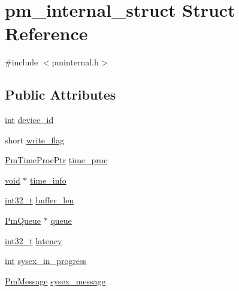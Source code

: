 \hypertarget{structpm__internal__struct}{}\section{pm\+\_\+internal\+\_\+struct Struct Reference}
\label{structpm__internal__struct}


{\ttfamily \#include $<$pminternal.\+h$>$}

\subsection*{Public Attributes}
\begin{DoxyCompactItemize}
\item 
\hyperlink{xmltok_8h_a5a0d4a5641ce434f1d23533f2b2e6653}{int} \hyperlink{structpm__internal__struct_a6434c3e3e21fad6289c32c480e13edd5}{device\+\_\+id}
\item 
short \hyperlink{structpm__internal__struct_abea16d3f5e2dc3d0a9e1e7d02ea45be5}{write\+\_\+flag}
\item 
\hyperlink{portmidi_8h_a86cdcb85cfa72e067bc2fd1b96fca05d}{Pm\+Time\+Proc\+Ptr} \hyperlink{structpm__internal__struct_aa2268f6b4916d4ae3de765d880bc8641}{time\+\_\+proc}
\item 
\hyperlink{sound_8c_ae35f5844602719cf66324f4de2a658b3}{void} $\ast$ \hyperlink{structpm__internal__struct_ac3ee4fe374d89f3040708206648acb07}{time\+\_\+info}
\item 
\hyperlink{lib-src_2ffmpeg_2win32_2stdint_8h_a37994e3b11c72957c6f454c6ec96d43d}{int32\+\_\+t} \hyperlink{structpm__internal__struct_a253ecc9475134223732c0b450e25c99e}{buffer\+\_\+len}
\item 
\hyperlink{pmutil_8h_aaffd2b634e54baa4759ee5dd2a32f717}{Pm\+Queue} $\ast$ \hyperlink{structpm__internal__struct_a883e467783d250a41089efa00df2bb4c}{queue}
\item 
\hyperlink{lib-src_2ffmpeg_2win32_2stdint_8h_a37994e3b11c72957c6f454c6ec96d43d}{int32\+\_\+t} \hyperlink{structpm__internal__struct_ad1458cf67c24a176a66dd8350c50ac0a}{latency}
\item 
\hyperlink{xmltok_8h_a5a0d4a5641ce434f1d23533f2b2e6653}{int} \hyperlink{structpm__internal__struct_abf9a68e60ff9e12d776af6807aa1467a}{sysex\+\_\+in\+\_\+progress}
\item 
\hyperlink{group__grp__events__filters_gad8455e4afe978a74c68e345bef99761d}{Pm\+Message} \hyperlink{structpm__internal__struct_a020e2d32d420628c81216a2be3d03d3c}{sysex\+\_\+message}
\item 

\end{DoxyCompactItemize}
